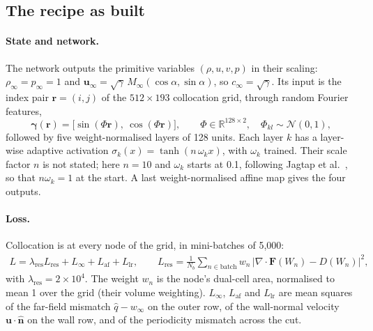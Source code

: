 \documentclass[11pt]{article}
\newcommand{\Ma}{M_\infty}
\newcommand{\vu}{\bm{u}}
\begin{document}
\subsection{The recipe as built}
\label{sec:s5recipe}

\paragraph{State and network.}
The network outputs the primitive variables $(\rho,u,v,p)$ in their scaling: $\rho_\infty =
p_\infty = 1$ and $\vu_\infty = \sqrt{\gamma}\,\Ma(\cos\alpha,\sin\alpha)$, so $c_\infty =
\sqrt\gamma$. Its input is the index pair $\bm r = (i,j)$ of the $512\times193$ collocation grid,
through random Fourier features,
\begin{equation}
  \bm\gamma(\bm r) = \bigl[\sin(\Phi\bm r),\ \cos(\Phi\bm r)\bigr],\qquad
  \Phi\in\mathbb R^{128\times2},\quad \Phi_{kl}\sim\mathcal N(0,1),
  \label{eq:fourierfeatures}
\end{equation}
followed by five weight-normalised layers of 128 units. Each layer $k$ has a layer-wise adaptive
activation $\sigma_k(x) = \tanh(n\,\omega_k x)$, with $\omega_k$ trained. Their scale factor $n$ is
not stated; here $n = 10$ and $\omega_k$ starts at 0.1, following Jagtap et
al.~\cite{jagtap2020}, so that $n\omega_k = 1$ at the start. A last weight-normalised affine map
gives the four outputs.

\paragraph{Loss.}
Collocation is at every node of the grid, in mini-batches of 5,000:
\begin{gather}
  L = \lambda_{\mathrm{res}} L_{\mathrm{res}} + L_\infty + L_{\mathrm{af}} + L_{\mathrm{lr}},\qquad
  L_{\mathrm{res}} = \frac1{N_b}\sum_{n\in\text{batch}} w_n\,\bigl|\nabla\!\cdot\!\bm F(W_n) - D(W_n)\bigr|^2,
  \label{eq:s5loss}
\end{gather}
with $\lambda_{\mathrm{res}} = 2\times10^4$. The weight $w_n$ is the node's dual-cell area,
normalised to mean 1 over the grid (their volume weighting). $L_\infty$, $L_{\mathrm{af}}$ and
$L_{\mathrm{lr}}$ are mean squares of the far-field mismatch $\hat q - w_\infty$ on the outer row,
of the wall-normal velocity $\vu\cdot\hat{\bm n}$ on the wall row, and of the periodicity
mismatch across the cut.
\end{document}
